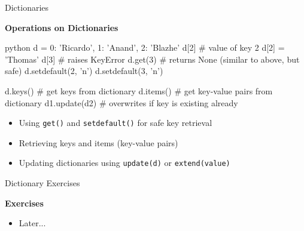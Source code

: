\documentclass[
	11pt, 
]{beamer}
\begin{document}

\begin{frame}[fragile]{Dictionaries}

\textbf{Operations on Dictionaries}

\begin{mintedbox}{python}
d = {0: 'Ricardo', 1: 'Anand', 2: 'Blazhe'}
d[2] # value of key 2
d[2] = 'Thomas'
d[3]  # raises KeyError
d.get(3)  # returns None (similar to above, but safe)
d.setdefault(2, 'n')
d.setdefault(3, 'n')

d.keys() # get keys from dictionary
d.items() # get key-value pairs from dictionary
d1.update(d2) # overwrites if key is existing already
\end{mintedbox}

\begin{itemize}
    \item Using \texttt{get()} and \texttt{setdefault()} for safe key retrieval
    \item Retrieving keys and items (key-value pairs)
    \item Updating dictionaries using \texttt{update(d)} or \texttt{extend(value)}
\end{itemize}


\end{frame}


\begin{frame}[fragile]{Dictionary Exercises}

\begin{alertblock}{\textbf{Exercises}}
\begin{itemize}
    \item Later...
\end{itemize}

\end{alertblock}
\end{frame}

\end{document}
